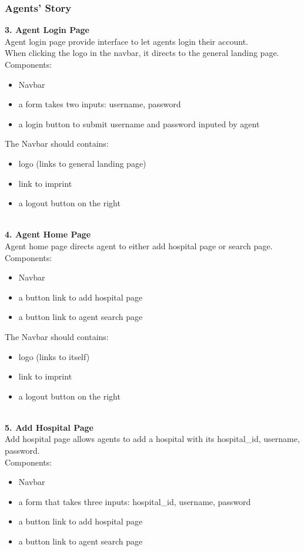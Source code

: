 \documentclass{article}
\begin{document}
\subsubsection*{Agents' Story}
\textbf{3. Agent Login Page}\\
Agent login page provide interface to let agents login their account.\\
When clicking the logo in the navbar, it directs to the general landing page.
Components:
\begin{itemize}
	\item Navbar
	\item a form takes two inputs: username, password
	\item a login button to submit username and password inputed by agent
\end{itemize}
The Navbar should contains:
\begin{itemize}
	\item logo (links to general landing page)
	\item link to imprint
	\item a logout button on the right
\end{itemize}
\\
\textbf{4. Agent Home Page}\\
Agent home page directs agent to either add hospital page or search page.\\
Components:
\begin{itemize}
	\item Navbar
	\item a button link to add hospital page
	\item a button link to agent search page
\end{itemize}
The Navbar should contains:
\begin{itemize}
	\item logo (links to itself)
	\item link to imprint
	\item a logout button on the right
\end{itemize}
\\
\textbf{5. Add Hospital Page}\\
Add hospital page allows agents to add a hospital with its hospital\_id, username, password.\\
Components:
\begin{itemize}
	\item Navbar
	\item a form that takes three inputs: hospital\_id, username, password
	\item a button link to add hospital page
	\item a button link to agent search page
\end{itemize}
\end{document}
